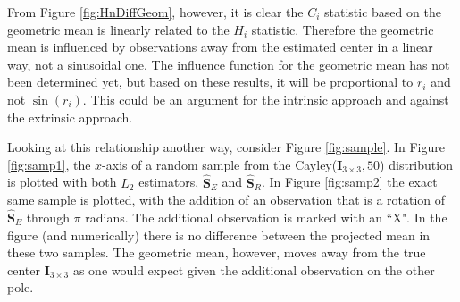 \documentclass{article}\usepackage[]{graphicx}\usepackage[]{color}
\newcommand{\ProjMean}{{\widehat{\bm S}_{E}}}
\newcommand{\GeomMean}{{\widehat{\bm S}_{R}}}
\begin{document}
From Figure \ref{fig:HnDiffGeom}, however, it is clear the $C_i$ statistic based on the geometric mean is linearly related to the $H_i$ statistic.  Therefore the geometric mean is influenced by observations away from the estimated center in a linear way, not a sinusoidal one.  The influence function for the geometric mean has not been determined yet, but based on these results, it will be proportional to $r_i$ and not $\sin(r_i)$.  This could be an argument for the intrinsic approach and against the extrinsic approach.

Looking at this relationship another way, consider Figure \ref{fig:sample}.  In Figure \ref{fig:samp1}, the $x$-axis of a random sample from the Cayley($\bm I_{3\times 3},50$) distribution is plotted with both $L_2$ estimators, $\ProjMean$ and $\GeomMean$.  In Figure \ref{fig:samp2} the exact same sample is plotted, with the addition of an observation that is a rotation of $\ProjMean$ through $\pi$ radians.  The additional observation is marked with an ``X".  In the figure (and numerically) there is no difference between the projected mean in these two samples.  The geometric mean, however, moves away from the true center $\bm I_{3\times 3}$ as one would expect given the additional observation on the other pole.
\end{document}
